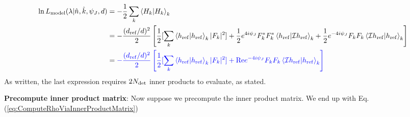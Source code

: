 \documentclass[twocolumn,prd,nofootinbib]{revtex4}
\newcommand\ForRichardOnly[1]{}
\newcommand\Y[1]{Y^{(#1)}{}}
\newcommand\qmstateproduct[2]{\left\langle#1|#2\right\rangle}
\begin{document}
\begin{widetext}
\begin{itemize}
\begin{align}
\ln L_{\rm model}(\lambda|\hat{n},\hat{k},\psi_J,d) &= -\frac{1}{2} \sum_k\qmstateproduct{H_k}{H_k}_k 
 \\
&= -\frac{(d_{\rm ref}/d)^2}{2}
\left[ \frac{1}{2} [ \sum_k \qmstateproduct{h_{\rm    ref}}{h_{\rm ref}}_k |F_k |^2 ]
 +\frac{1}{2} e^{4i\psi_J} F_k^* F_k^* \qmstateproduct{h_{\rm ref}}{{\cal I}h_{\rm ref}}_k
 + \frac{1}{2} e^{-4i\psi_J} F_k F_k \qmstateproduct{{\cal I} h_{\rm ref}}{h_{\rm ref}}_k 
\right] \\
&= 
{\color{blue}
-\frac{(d_{\rm ref}/d)^2}{2}
\left[ \frac{1}{2} [ \sum_k \qmstateproduct{h_{\rm    ref}}{h_{\rm ref}}_k|F_k|^2 ]
 + \text{Re} e^{-4i\psi_J} F_k F_k \qmstateproduct{{\cal I} h_{\rm ref}}{h_{\rm ref}}_k 
\right]
}
\end{align}
As written, the last expression requires $2N_{\rm det}$ inner products to evaluate, as stated.  

\noindent \textbf{Precompute inner product matrix}: Now suppose we precompute the inner product matrix.  We end up with 
Eq. (\ref{eq:ComputeRhoViaInnerProductMatrix})

\end{itemize}

\ForRichardOnly{
\noindent \textbf{Marginalization scheme}: We want to evaluate $L_{\rm red} \equiv \int p(\theta)L(\lambda,\theta)$:

\begin{itemize}
\item \emph{Easy extrinsic first}: Marginalize over $t,d$ and perhaps $\psi_J$ first: these require no $O(N)$
  operations.  For example, in the first case $L_{\rm model}=-\rho^2/2$ scales trivially as $1/d^2$.

I recommend doing this 1d or 2d integral with raw quadrature -- particularly the 1d time case, which requires some care.

\begin{shaded}
Since sky location and emission direction are fixed, we can preprocess and scale $Q_k$ and $P_k$ by their fixed
prefactors, generating short fiducial timeseries (only needed over the window time)
\begin{eqnarray}
\bar{Q}(t) \equiv  \sum_{k,lm}(F_k(-\hat{k}) \Y{-2}_{lm}(\hat{n}))^* Q_{k,lm}(t-\hat{k}\cdot x_k) \\
\bar{P}(t)\equiv   \sum_{klm} (F_k(-\hat{k}) \Y{-2}_{lm}(\hat{n}) ) P_{k,lm}(t-\hat{k}\cdot x_k)  \\
\ln L_{\rm data}(\lambda|t,\hat{n},\hat{k},\psi_J,d)  = (d_{\rm ref}/d)[e^{+i2\psi_J} \bar{Q}(t)  + e^{+i2\psi_J}
  \bar{Q}(t)] 
\end{eqnarray}
The computation of $\rho^2$ has the form
\begin{eqnarray}
\ln L_{\rm model}  = -\frac{(d_{\rm ref}/d)^2}{2}\left[ A  + B \cos 4(\psi-\psi_0) \right] \\
B = |\sum_k F_k F_k \qmstateproduct{{\cal I}h_{\rm ref}}{h_{\rm ref}}_k|
\end{eqnarray}
The value of $\psi_0$ is unimportant and marginalized away.  


\end{shaded}
\end{itemize}}
\end{widetext}
\end{document}
